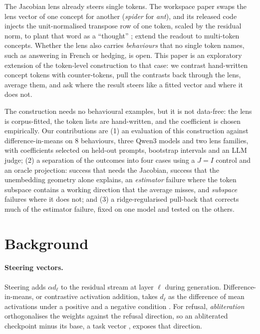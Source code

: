 \documentclass{article}
\begin{document}
The Jacobian lens already steers single tokens. The workspace paper swaps the lens vector of one concept for another (\emph{spider} for \emph{ant}), and its released code injects the unit-normalised transpose row of one token, scaled by the residual norm, to plant that word as a ``thought'' \citep{gurnee2026code}; \citet{gong2026firsttoken} extend the readout to multi-token concepts. Whether the lens also carries \emph{behaviours} that no single token names, such as answering in French or hedging, is open. This paper is an exploratory extension of the token-level construction to that case: we contrast hand-written concept tokens with counter-tokens, pull the contrasts back through the lens, average them, and ask where the result steers like a fitted vector and where it does not.

The construction needs no behavioural examples, but it is not data-free: the lens is corpus-fitted, the token lists are hand-written, and the coefficient is chosen empirically. Our contributions are (1) an evaluation of this construction against difference-in-means on 8 behaviours, three Qwen3 models and two lens families, with coefficients selected on held-out prompts, bootstrap intervals and an LLM judge; (2) a separation of the outcomes into four cases using a $J{=}I$ control and an oracle projection: success that needs the Jacobian, success that the unembedding geometry alone explains, an \emph{estimator} failure where the token subspace contains a working direction that the average misses, and \emph{subspace} failures where it does not; and (3) a ridge-regularised pull-back that corrects much of the estimator failure, fixed on one model and tested on the others.

\section{Background}

\paragraph{Steering vectors.}
Steering adds $\alpha d_\ell$ to the residual stream at layer $\ell$ during generation. Difference-in-means, or contrastive activation addition, takes $d_\ell$ as the difference of mean activations under a positive and a negative condition \citep{rimsky2024caa}. For refusal, \emph{abliteration} \citep{arditi2024refusal} orthogonalises the weights against the refusal direction, so an abliterated checkpoint minus its base, a task vector \citep{ilharco2023task}, exposes that direction.
\end{document}
